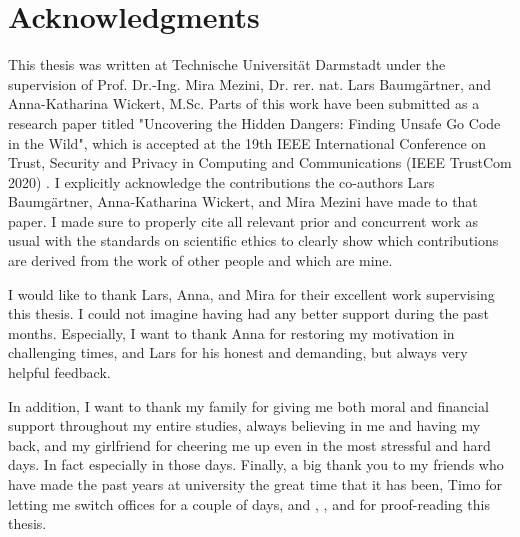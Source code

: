 \chapter*{Acknowledgments}

This thesis was written at Technische Universität Darmstadt under the supervision of Prof. Dr.-Ing. Mira Mezini,
Dr. rer. nat. Lars Baumgärtner, and Anna-Katharina Wickert, M.Sc.
Parts of this work have been submitted as a research paper titled "Uncovering the Hidden Dangers: Finding Unsafe Go Code
in the Wild", which is accepted at the 19th IEEE International Conference on Trust, Security and Privacy in
Computing and Communications (IEEE TrustCom 2020) .
I explicitly acknowledge the contributions the co-authors Lars Baumgärtner, Anna-Katharina Wickert, and Mira Mezini
have made to that paper.
I made sure to properly cite all relevant prior and concurrent work as usual with the standards on scientific ethics
to clearly show which contributions are derived from the work of other people and which are mine.

I would like to thank Lars, Anna, and Mira for their excellent work supervising this thesis.
I could not imagine having had any better support during the past months.
Especially, I want to thank Anna for restoring my motivation in challenging times, and Lars for his honest and
demanding, but always very helpful feedback.

In addition, I want to thank my family for giving me both moral and financial support throughout my entire studies,
always believing in me and having my back, and my girlfriend for cheering me up even in the most stressful and hard
days.
In fact especially in those days.
Finally, a big thank you to my friends who have made the past years at university the great time that it has been, Timo
for letting me switch offices for a couple of days, and , , and  for proof-reading this thesis.
